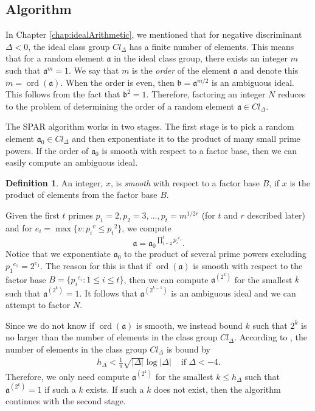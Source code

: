 \documentclass{ucalgthes1}
\theoremstyle{plain}
\theoremstyle{definition}
\newtheorem{defn}[thm]{Definition}
\DeclareMathOperator{\ord}{ord}
\begin{document}
\subsection{Algorithm}

In Chapter \ref{chap:idealArithmetic}, we mentioned that for negative discriminant $\Delta < 0$, the ideal class group $Cl_\Delta$ has a finite number of elements.  This means that for a random element $\mathfrak a$ in the ideal class group, there exists an integer $m$ such that ${\mathfrak a}^m = 1$. We say that $m$ is the \emph{order} of the element $\mathfrak a$ and denote this $m = \ord(\mathfrak a)$.  When the order is even, then $\mathfrak b = {\mathfrak a}^{m/2}$ is an ambiguous ideal.  This follows from the fact that ${\mathfrak b}^2 = 1$.  Therefore, factoring an integer $N$ reduces to the problem of determining the order of a random element $\mathfrak a \in Cl_\Delta$.

The SPAR algorithm works in two stages. The first stage is to pick a random element $\mathfrak a_0 \in Cl_\Delta$ and then exponentiate it to the product of many small prime powers.  If the order of $\mathfrak a_0$ is smooth with respect to a factor base, then we can easily compute an ambiguous ideal.

\begin{defn}
An integer, $x$, is \emph{smooth} with respect to a factor base $B$, if $x$ is the product of elements from the factor base $B$.
\end{defn}

Given the first $t$ primes $p_1 = 2, p_2 = 3, ..., p_t = m^{1/2r}$ (for $t$ and $r$ described later) and for $e_i = \max \{ v : {p_i}^v \le {p_t}^2 \}$, we compute
\[
	\mathfrak a = {\mathfrak a_0}^{\prod_{i=2}^t {p_i}^{e_i}}.
\]
Notice that we exponentiate $\mathfrak a_0$ to the product of several prime powers excluding ${p_1}^{e_1} = 2^{e_1}$.  The reason for this is that if $\ord(\mathfrak a)$ is smooth with respect to the factor base $B = \{{p_i}^{e_i} : 1 \le i \le t\}$, then we can compute ${\mathfrak a}^{\left(2^k\right)}$ for the smallest $k$ such that ${\mathfrak a}^{\left(2^k\right)} = 1$.  It follows that ${\mathfrak a}^{\left(2^{k-1}\right)}$ is an ambiguous ideal and we can attempt to factor $N$.

Since we do not know if $\ord(\mathfrak a)$ is smooth, we instead bound $k$ such that $2^k$ is no larger than the number of elements in the class group $Cl_\Delta$.  According to \cite[p.155]{Jacobson2009}, the number of elements in the class group $Cl_\Delta$ is bound by
\begin{align}
	h_\Delta < \frac{1}{\pi} \sqrt{|\Delta|}\log{|\Delta|} & \textrm{ if } \Delta < -4.
\end{align}
Therefore, we only need compute $\mathfrak a^{\left(2^k\right)}$ for the smallest $k \le h_\Delta$ such that $\mathfrak a^{\left(2^k\right)} = 1$ if such a $k$ exists. If such a $k$ does not exist, then the algorithm continues with the second stage.
\end{document}
